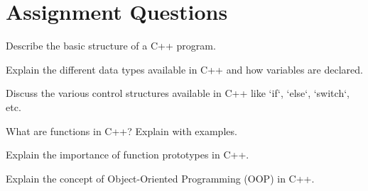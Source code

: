 \documentclass{assignment}
\begin{document}

\section*{Assignment Questions}

Describe the basic structure of a C++ program.

Explain the different data types available in C++ and how variables are declared.

Discuss the various control structures available in C++ like `if`, `else`, `switch`, etc.

What are functions in C++? Explain with examples.

Explain the importance of function prototypes in C++.

Explain the concept of Object-Oriented Programming (OOP) in C++.
\end{document}
